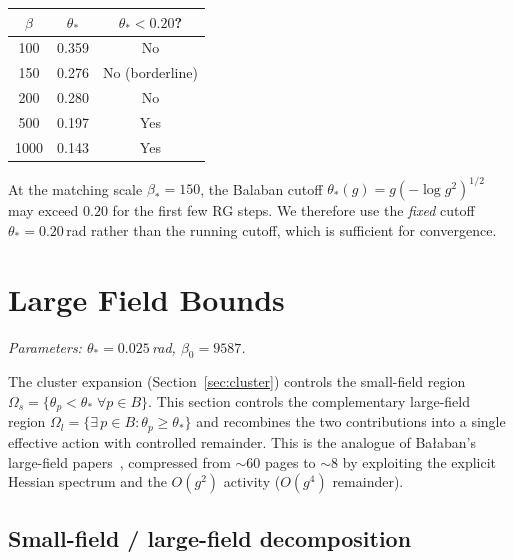 \documentclass[11pt]{article}
\theoremstyle{definition}
\begin{document}
\begin{center}
\begin{tabular}{ccc}
\toprule
$\beta$ & $\theta_*$ & $\theta_*<0.20$?\\
\midrule
100 & 0.359 & No\\
150 & 0.276 & No (borderline)\\
200 & 0.280 & No\\
500 & 0.197 & Yes\\
1000 & 0.143 & Yes\\
\bottomrule
\end{tabular}
\end{center}
At the matching scale $\beta_*=150$, the Balaban cutoff
$\theta_*(g)=g(-\log g^2)^{1/2}$ may exceed $0.20$ for the first few
RG steps.  We therefore use the \emph{fixed} cutoff
$\theta_*=0.20$\,rad rather than the running cutoff, which is
sufficient for convergence.

\section{Large Field Bounds}\label{sec:largefield}

\noindent\emph{Parameters: $\theta_*=0.025$\,rad,
$\beta_0=9587$.}

\medskip
The cluster expansion (Section~\ref{sec:cluster}) controls the small-field
region $\Omega_s=\{\theta_p<\theta_*\;\forall p\in B\}$.  This section
controls the complementary large-field region
$\Omega_l=\{\exists\,p\in B:\theta_p\ge\theta_*\}$ and recombines the
two contributions into a single effective action with controlled remainder.
This is the analogue of Ba\l aban's large-field papers~\cite{BalabanLF1,BalabanLF2},
compressed from ${\sim}60$ pages to ${\sim}8$ by exploiting the explicit
Hessian spectrum and the $O(g^2)$ activity ($O(g^4)$ remainder).

\subsection{Small-field / large-field decomposition}
\end{document}
